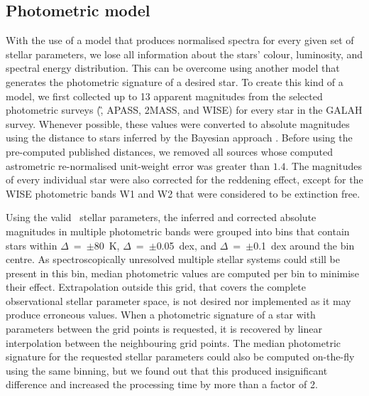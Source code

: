 \subsection{Photometric model}
\label{sec:p_model}
With the use of a model that produces normalised spectra for every given set of stellar parameters, we lose all information about the stars' colour, luminosity, and spectral energy distribution. This can be overcome using another model that generates the photometric signature of a desired star. To create this kind of a model, we first collected up to 13 apparent magnitudes from the selected photometric surveys (\G, APASS, 2MASS, and WISE) for every star in the GALAH survey. Whenever possible, these values were converted to absolute magnitudes using the distance to stars inferred by the Bayesian approach \citep{2018AJ....156...58B}. Before using the pre-computed published distances, we removed all sources whose computed astrometric re-normalised unit-weight error \citep[RUWE,][]{ruwe} was greater than $1.4$. The magnitudes of every individual star were also corrected for the reddening effect, except for the WISE photometric bands W1 and W2 that were considered to be extinction free.

Using the valid \TC\ stellar parameters, the inferred and corrected absolute magnitudes in multiple photometric bands were grouped into bins that contain stars within $\Delta$\Teff~=~$\pm$80~K, $\Delta$\Logg~=~$\pm$0.05~dex, and $\Delta$\Feh~=~$\pm$0.1~dex around the bin centre. As spectroscopically unresolved multiple stellar systems could still be present in this bin, median photometric values are computed per bin to minimise their effect. Extrapolation outside this grid, that covers the complete observational stellar parameter space, is not desired nor implemented as it may produce erroneous values. When a photometric signature of a star with parameters between the grid points is requested, it is recovered by linear interpolation between the neighbouring grid points. The median photometric signature for the requested stellar parameters could also be computed on-the-fly using the same binning, but we found out that this produced insignificant difference and increased the processing time by more than a factor of 2.

